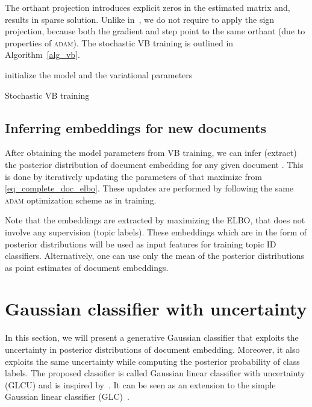 \documentclass[journal]{IEEEtran}
\begin{document}
The orthant projection introduces explicit zeros in the estimated  
matrix and, results in sparse solution. Unlike in~\cite{Kesiraju:2016:SMM}, we 
do not require to apply the sign projection, because both the gradient
 and step  point to the same orthant (due 
to properties of \textsc{adam}).
The stochastic VB training is outlined in Algorithm~\ref{alg_vb}.
\begin{algorithm}[!t]
\DontPrintSemicolon
initialize the model and the variational parameters\;
	\caption{Stochastic VB training} \label{alg_vb}
\end{algorithm}
\subsection{Inferring embeddings for new documents}
\label{ssec:extraction}
After obtaining the model parameters from VB training, we can infer (extract) 
the posterior distribution of document embedding  for any given 
document . This is done by iteratively updating the parameters of 
 that maximize  from 
\eqref{eq_complete_doc_elbo}. These updates are performed by following the 
same \textsc{adam} optimization scheme as in training.


Note that the embeddings are extracted by maximizing the ELBO, that does not 
involve any supervision (topic labels). These embeddings which are in the form 
of posterior distributions will be used as input features for training topic ID 
classifiers. Alternatively, one can use only the mean of the posterior 
distributions as point estimates of document embeddings.

\section{Gaussian classifier with uncertainty}
\label{sec:glcu}
In this section, we will present a generative Gaussian classifier that exploits 
the uncertainty in posterior distributions of document embedding. Moreover, it 
also exploits the same uncertainty while computing the posterior probability of 
class labels. The proposed classifier is called Gaussian linear classifier with 
uncertainty (GLCU) and is inspired by~\cite{Kenny:2013:PLDA,Sandro:2015:IS}. 
It can be seen as an extension to the simple Gaussian linear classifier 
(GLC)~\cite{Bishop:2006:PRML}. 
\end{document}
